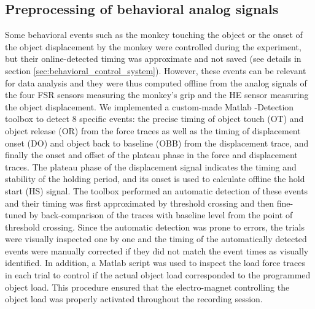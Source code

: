 {\subsection{Preprocessing of behavioral analog signals}

Some behavioral events such as the monkey touching the object or the onset of the object displacement by the monkey were controlled during the experiment, but their online-detected timing was approximate and not saved (see details in section \cref{sec:behavioral_control_system}). However, these events can be relevant for data analysis and they were thus computed offline from the analog signals of the four FSR sensors measuring the monkey's grip and the HE sensor measuring the object displacement. We implemented a custom-made Matlab -Detection toolbox to detect 8 specific events: the precise timing of object touch (OT) and object release (OR) from the force traces as well as the timing of displacement onset (DO) and object back to baseline (OBB) from the displacement trace, and finally the onset and offset of the plateau phase in the force and displacement traces. The plateau phase of the displacement signal indicates the timing and stability of the holding period, and its onset is used to calculate offline the hold start (HS) signal. The toolbox performed an automatic detection of these events and their timing was first approximated by threshold crossing and then fine-tuned by back-comparison of the traces with baseline level from the point of threshold crossing. Since the automatic detection was prone to errors, the trials were visually inspected one by one and the timing of the automatically detected events were manually corrected if they did not match the event times as visually identified. In addition, a Matlab script was used to inspect the load force traces in each trial to control if the actual object load corresponded to the programmed object load. This procedure ensured that the electro-magnet controlling the object load was properly activated throughout the recording session. 

}
